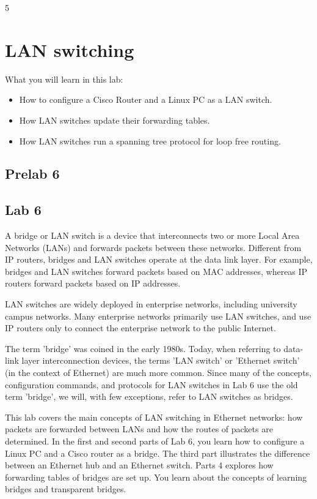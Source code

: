 
\setcounter {chapter} {5} 

\chapter{LAN switching}

What you will learn in this lab:
\begin{itemize}
	\item How to configure a Cisco Router and a Linux PC as a LAN switch.
	\item How LAN switches update their forwarding tables.
	\item How LAN switches run a spanning tree protocol for loop free routing.
\end{itemize}

\newpage
{}
\section{Prelab 6}\label{sec:prelab6}


\newpage
{}
\section{Lab 6}\label{sec:lab6}

A bridge or LAN switch is a device that interconnects two or more Local Area Networks (LANs) and forwards packets between these networks. Different from IP routers, bridges and LAN switches operate at the data link layer. For example, bridges and LAN switches forward packets based on MAC addresses, whereas IP routers forward packets based on IP addresses.

LAN switches are widely deployed in enterprise networks, including university campus networks. Many enterprise networks primarily use LAN switches, and use IP routers only to connect the enterprise network to the public Internet.

The term 'bridge' was coined in the early 1980s. Today, when referring to data-link layer interconnection devices, the terms 'LAN switch' or 'Ethernet switch' (in the context of Ethernet) are much more common. Since many of the concepts, configuration commands, and protocols for LAN switches in Lab 6 use the old term 'bridge', we will, with few exceptions, refer to LAN switches as bridges.

This lab covers the main concepts of LAN switching in Ethernet networks: how packets are forwarded between LANs and how the routes of packets are determined. In the first and second parts of Lab 6, you learn how to configure a Linux PC and a Cisco router as a bridge. The third part illustrates the difference between an Ethernet hub and an Ethernet switch. Parts 4 explores how forwarding tables of bridges are set up. You learn about the concepts of learning bridges and transparent bridges.


